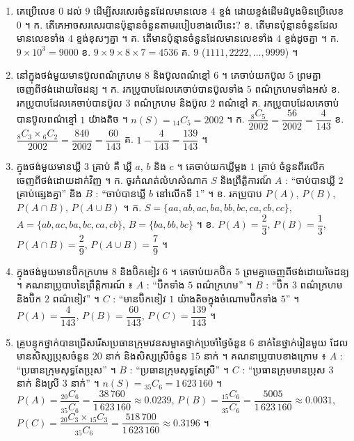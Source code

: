\begin{enumerate}[1]
  \ans
  $n(S) = {}_{12}C_4 = 495$ ។ ក. $\dfrac{{}_7C_4}{495} = \dfrac{35}{495} = \dfrac{7}{99}$ \quad ខ. $1 - \dfrac{7}{99} = \dfrac{92}{99}$ ។
  \item គេប្រើលេខ $0$ ដល់ $9$ ដើម្បីសរសេរចំនួនដែលមានលេខ $4$ ខ្ទង់ ដោយខ្ទង់ដើមដំបូងមិនប្រើលេខ $0$ ។ \quad ក. តើគេអាចសរសេរបានប៉ុន្មានចំនួនតាមរបៀបខាងលើនេះ? \quad ខ. តើមានប៉ុន្មានចំនួនដែលមានលេខទាំង $4$ ខ្ទង់ខុសៗគ្នា ។ \quad គ. តើមានប៉ុន្មានចំនួនដែលមានលេខទាំង $4$ ខ្ទង់ដូចគ្នា ។
  \ans
  ក. $9\times 10^3 = 9000$ \quad ខ. $9\times 9\times 8\times 7 = 4536$ \quad គ. $9$ ($1111, 2222, \dots, 9999$) ។
  \item នៅក្នុងថង់មួយមានប៊ូលពណ៌ក្រហម $8$ និងប៊ូលពណ៌ខ្មៅ $6$ ។ គេចាប់យកប៊ូល $5$ ព្រមគ្នាចេញពីថង់ដោយចៃដន្យ ។ \quad ក. រកប្រូបាបដែលគេចាប់បានប៊ូលទាំង $5$ ពណ៌ក្រហមទាំងអស់ \quad ខ. រកប្រូបាបដែលគេចាប់បានប៊ូល $3$ ពណ៌ក្រហម និងប៊ូល $2$ ពណ៌ខ្មៅ \quad គ. រកប្រូបាបដែលគេចាប់បានប៊ូលពណ៌ខ្មៅ $1$ យ៉ាងតិច ។
  \ans
  $n(S) = {}_{14}C_5 = 2002$ ។ ក. $\dfrac{{}_8C_5}{2002} = \dfrac{56}{2002} = \dfrac{4}{143}$ \quad ខ. $\dfrac{{}_8C_3\times{}_6C_2}{2002} = \dfrac{840}{2002} = \dfrac{60}{143}$ \quad គ. $1 - \dfrac{4}{143} = \dfrac{139}{143}$ ។
  \item ក្នុងថង់មួយមានឃ្លី $3$ គ្រាប់ គឺ ឃ្លី $a$, $b$ និង $c$ ។ គេចាប់យកឃ្លីម្ដង $1$ គ្រាប់ ចំនួនពីរលើកចេញពីថង់ដោយដាក់វិញ ។ \quad ក. ចូរកំណត់លំហសំណាក $S$ និងព្រឹត្តិការណ៍ $A$ : “ចាប់បានឃ្លី $2$ គ្រាប់ផ្សេងគ្នា” និង $B$ : “ចាប់បានឃ្លី $b$ នៅលើកទី $1$” ។ \quad ខ. រកប្រូបាប $P(A)$, $P(B)$, $P(A \cap B)$, $P(A \cup B)$ ។
  \ans
  ក. $S = \{aa, ab, ac, ba, bb, bc, ca, cb, cc\}$, $A = \{ab, ac, ba, bc, ca, cb\}$, $B = \{ba, bb, bc\}$ ។ \quad ខ. $P(A) = \dfrac{2}{3}$, $P(B) = \dfrac{1}{3}$, $P(A \cap B) = \dfrac{2}{9}$, $P(A \cup B) = \dfrac{7}{9}$ ។
  \item ក្នុងថង់មួយមានប៊ិកក្រហម $8$ និងប៊ិកខៀវ $6$ ។ គេចាប់យកប៊ិក $5$ ព្រមគ្នាចេញពីថង់ដោយចៃដន្យ ។ គណនាប្រូបាបនៃព្រឹត្តិការណ៍ ៖ $A$ : “ប៊ិកទាំង $5$ ពណ៌ក្រហម” ។ $B$ : “ប៊ិក $3$ ពណ៌ក្រហមនិងប៊ិក $2$ ពណ៌ខៀវ” ។ $C$ : “មានប៊ិកខៀវ $1$ យ៉ាងតិចក្នុងចំណោមប៊ិកទាំង $5$” ។
  \ans
  $P(A) = \dfrac{4}{143}$, $P(B) = \dfrac{60}{143}$, $P(C) = \dfrac{139}{143}$ ។
  \item គ្រូបន្ទុកថ្នាក់បានជ្រើសរើសប្រធានក្រុមវេនសម្អាតថ្នាក់ប្រចាំថ្ងៃចំនួន $6$ នាក់នៃថ្នាក់រៀនមួយ ដែលមានសិស្សប្រុសចំនួន $20$ នាក់ និងសិស្សស្រីចំនួន $15$ នាក់ ។ គណនាប្រូបាបខាងក្រោម ៖ $A$ : “ប្រធានក្រុមសុទ្ធតែប្រុស” ។ $B$ : “ប្រធានក្រុមសុទ្ធតែស្រី” ។ $C$ : “ប្រធានក្រុមមានប្រុស $3$ នាក់ និងស្រី $3$ នាក់” ។
  \ans
  $n(S) = {}_{35}C_6 = 1\,623\,160$ ។ $P(A) = \dfrac{{}_{20}C_6}{{}_{35}C_6} = \dfrac{38\,760}{1\,623\,160} \approx 0.0239$, $P(B) = \dfrac{{}_{15}C_6}{{}_{35}C_6} = \dfrac{5005}{1\,623\,160} \approx 0.0031$, $P(C) = \dfrac{{}_{20}C_3\times{}_{15}C_3}{{}_{35}C_6} = \dfrac{518\,700}{1\,623\,160} \approx 0.3196$ ។

\end{enumerate}
